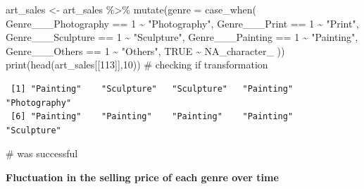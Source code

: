 \documentclass[
  12pt,
]{article}
\newenvironment{Shaded}{\begin{snugshade}}{\end{snugshade}}
\newcommand{\AttributeTok}[1]{\textcolor[rgb]{0.40,0.45,0.13}{#1}}
\newcommand{\CommentTok}[1]{\textcolor[rgb]{0.37,0.37,0.37}{#1}}
\newcommand{\ConstantTok}[1]{\textcolor[rgb]{0.56,0.35,0.01}{#1}}
\newcommand{\DecValTok}[1]{\textcolor[rgb]{0.68,0.00,0.00}{#1}}
\newcommand{\FunctionTok}[1]{\textcolor[rgb]{0.28,0.35,0.67}{#1}}
\newcommand{\NormalTok}[1]{\textcolor[rgb]{0.00,0.23,0.31}{#1}}
\newcommand{\OtherTok}[1]{\textcolor[rgb]{0.00,0.23,0.31}{#1}}
\newcommand{\SpecialCharTok}[1]{\textcolor[rgb]{0.37,0.37,0.37}{#1}}
\newcommand{\StringTok}[1]{\textcolor[rgb]{0.13,0.47,0.30}{#1}}
\begin{document}
\begin{Shaded}
\begin{Highlighting}[]
\NormalTok{art\_sales }\OtherTok{\textless{}{-}}\NormalTok{ art\_sales }\SpecialCharTok{\%\textgreater{}\%}
  \FunctionTok{mutate}\NormalTok{(}\AttributeTok{genre =} \FunctionTok{case\_when}\NormalTok{(}
\NormalTok{    Genre\_\_\_Photography }\SpecialCharTok{==} \DecValTok{1} \SpecialCharTok{\textasciitilde{}} \StringTok{"Photography"}\NormalTok{,}
\NormalTok{    Genre\_\_\_Print }\SpecialCharTok{==} \DecValTok{1} \SpecialCharTok{\textasciitilde{}} \StringTok{"Print"}\NormalTok{,}
\NormalTok{    Genre\_\_\_Sculpture }\SpecialCharTok{==} \DecValTok{1} \SpecialCharTok{\textasciitilde{}} \StringTok{"Sculpture"}\NormalTok{,}
\NormalTok{    Genre\_\_\_Painting }\SpecialCharTok{==} \DecValTok{1} \SpecialCharTok{\textasciitilde{}} \StringTok{"Painting"}\NormalTok{,}
\NormalTok{    Genre\_\_\_Others }\SpecialCharTok{==} \DecValTok{1} \SpecialCharTok{\textasciitilde{}} \StringTok{"Others"}\NormalTok{,}
    \ConstantTok{TRUE} \SpecialCharTok{\textasciitilde{}} \ConstantTok{NA\_character\_}  
\NormalTok{  ))}
\FunctionTok{print}\NormalTok{(}\FunctionTok{head}\NormalTok{(art\_sales[[}\DecValTok{113}\NormalTok{]],}\DecValTok{10}\NormalTok{)) }\CommentTok{\# checking if transformation }
\end{Highlighting}
\end{Shaded}

\begin{verbatim}
 [1] "Painting"    "Sculpture"   "Sculpture"   "Painting"    "Photography"
 [6] "Painting"    "Painting"    "Painting"    "Painting"    "Sculpture"  
\end{verbatim}

\begin{Shaded}
\begin{Highlighting}[]
                                \CommentTok{\# was successful }
\end{Highlighting}
\end{Shaded}

\textbf{Fluctuation in the selling price of each genre over time}
\end{document}

